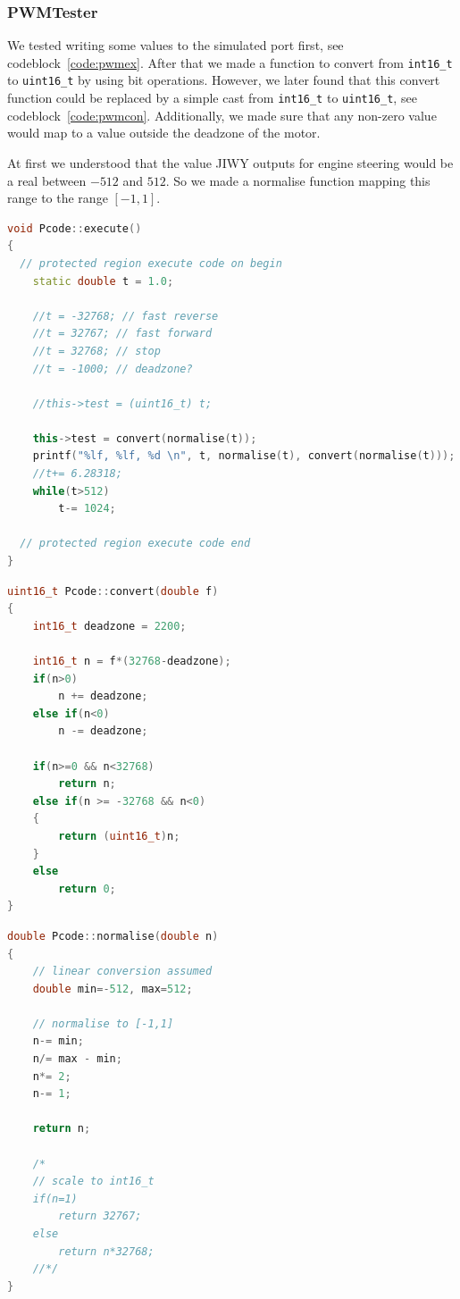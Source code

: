 \documentclass[a4paper,twoside,11pt]{article}
\begin{document}
\subsubsection{PWMTester}
We tested writing some values to the simulated port first, see codeblock~\ref{code:pwmex}.
After that we made a function to convert from \texttt{int16\_t} to \texttt{uint16\_t} by using bit operations. However, we later found that this convert function could be replaced by a simple 
cast from \texttt{int16\_t} to \texttt{uint16\_t}, see codeblock~\ref{code:pwmcon}. Additionally, we made sure that any non-zero value would map to a value outside the deadzone of the motor.

At first we understood that the value JIWY outputs for engine steering would be a real between $-512$ and $512$. So we made a normalise function mapping this range to the range $[-1, 1]$.

\begin{lstlisting}[caption=Pcode::execute, label=code:pwmex, language=C++]
void Pcode::execute()
{
  // protected region execute code on begin
	static double t = 1.0;

	//t = -32768; // fast reverse
	//t = 32767; // fast forward
	//t = 32768; // stop
	//t = -1000; // deadzone?

	//this->test = (uint16_t) t;

	this->test = convert(normalise(t));
	printf("%lf, %lf, %d \n", t, normalise(t), convert(normalise(t)));
	//t+= 6.28318;
	while(t>512)
		t-= 1024;

  // protected region execute code end
}
\end{lstlisting}
\begin{lstlisting}[caption=Pcode::convert, label=code:pwmcon, language=C++]
uint16_t Pcode::convert(double f)
{
	int16_t deadzone = 2200;

	int16_t n = f*(32768-deadzone);
	if(n>0)
		n += deadzone;
	else if(n<0)
		n -= deadzone;

	if(n>=0 && n<32768)
		return n;
	else if(n >= -32768 && n<0)
	{
		return (uint16_t)n;
	}
	else
		return 0;
}
\end{lstlisting}
\begin{lstlisting}[caption=Pcode::normalise, label=code:pwmnor, language=C++]
double Pcode::normalise(double n)
{
	// linear conversion assumed
	double min=-512, max=512;

	// normalise to [-1,1]
	n-= min;
	n/= max - min;
	n*= 2;
	n-= 1;

	return n;

	/*
	// scale to int16_t
	if(n=1)
		return 32767;
	else
		return n*32768;
	//*/
}
\end{lstlisting}
\end{document}

